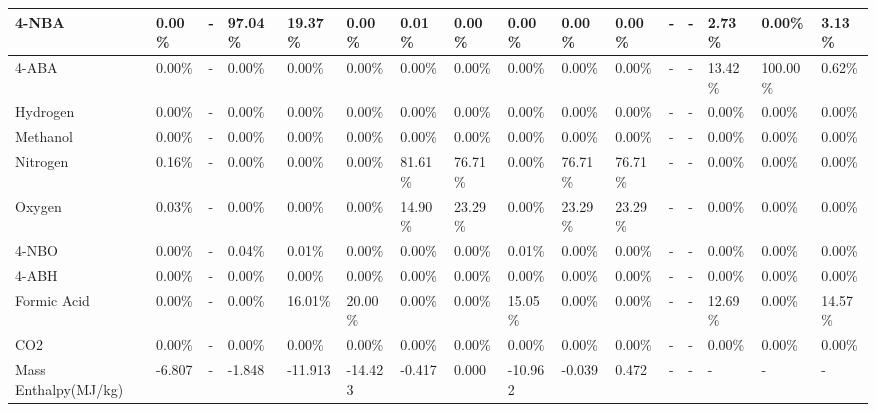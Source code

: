 \begin{landscape}
\begin{table}[H]
\begin{tabular}{|l|l|l|l|l|l|l|l|l|l|l|l|l|l|l|l|}
4-NBA                   & 0.00\%  & -    & 97.04\% & 19.37\% & 0.00\%  & 0.01\%  & 0.00\%  & 0.00\%  & 0.00\%  & 0.00\%  & -    & -    & 2.73\%  & 0.00\%   & 3.13\%  \\ \hline
4-ABA                   & 0.00\%  & -    & 0.00\%  & 0.00\%  & 0.00\%  & 0.00\%  & 0.00\%  & 0.00\%  & 0.00\%  & 0.00\%  & -    & -    & 13.42\% & 100.00\% & 0.62\%  \\ \hline
Hydrogen                & 0.00\%  & -    & 0.00\%  & 0.00\%  & 0.00\%  & 0.00\%  & 0.00\%  & 0.00\%  & 0.00\%  & 0.00\%  & -    & -    & 0.00\%  & 0.00\%   & 0.00\%  \\ \hline
Methanol                & 0.00\%  & -    & 0.00\%  & 0.00\%  & 0.00\%  & 0.00\%  & 0.00\%  & 0.00\%  & 0.00\%  & 0.00\%  & -    & -    & 0.00\%  & 0.00\%   & 0.00\%  \\ \hline
Nitrogen                & 0.16\%  & -    & 0.00\%  & 0.00\%  & 0.00\%  & 81.61\% & 76.71\% & 0.00\%  & 76.71\% & 76.71\% & -    & -    & 0.00\%  & 0.00\%   & 0.00\%  \\ \hline
Oxygen                  & 0.03\%  & -    & 0.00\%  & 0.00\%  & 0.00\%  & 14.90\% & 23.29\% & 0.00\%  & 23.29\% & 23.29\% & -    & -    & 0.00\%  & 0.00\%   & 0.00\%  \\ \hline
4-NBO                   & 0.00\%  & -    & 0.04\%  & 0.01\%  & 0.00\%  & 0.00\%  & 0.00\%  & 0.01\%  & 0.00\%  & 0.00\%  & -    & -    & 0.00\%  & 0.00\%   & 0.00\%  \\ \hline
4-ABH                   & 0.00\%  & -    & 0.00\%  & 0.00\%  & 0.00\%  & 0.00\%  & 0.00\%  & 0.00\%  & 0.00\%  & 0.00\%  & -    & -    & 0.00\%  & 0.00\%   & 0.00\%  \\ \hline
Formic Acid             & 0.00\%  & -    & 0.00\%  & 16.01\% & 20.00\% & 0.00\%  & 0.00\%  & 15.05\% & 0.00\%  & 0.00\%  & -    & -    & 12.69\% & 0.00\%   & 14.57\% \\ \hline
CO2                     & 0.00\%  & -    & 0.00\%  & 0.00\%  & 0.00\%  & 0.00\%  & 0.00\%  & 0.00\%  & 0.00\%  & 0.00\%  & -    & -    & 0.00\%  & 0.00\%   & 0.00\%  \\ \hline
Mass Enthalpy(MJ/kg)    & -6.807  & -    & -1.848  & -11.913 & -14.423 & -0.417  & 0.000   & -10.962 & -0.039  & 0.472   & -    & -    & -       & -        & -       \\ \hline
\end{tabular}
\end{table}



\end{landscape}
